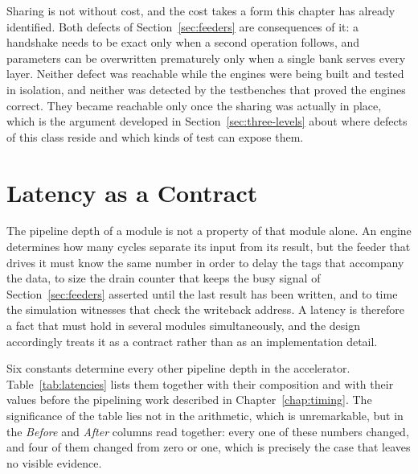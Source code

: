 Sharing is not without cost, and the cost takes a form this chapter has already
identified. Both defects of Section~\ref{sec:feeders} are consequences of it: a
handshake needs to be exact only when a second operation follows, and
parameters can be overwritten prematurely only when a single bank serves every
layer. Neither defect was reachable while the engines were being built and
tested in isolation, and neither was detected by the testbenches that proved
the engines correct. They became reachable only once the sharing was actually
in place, which is the argument developed in Section~\ref{sec:three-levels}
about where defects of this class reside and which kinds of test can expose
them.

\section{Latency as a Contract}
\label{sec:latency-contract}

The pipeline depth of a module is not a property of that module alone. An engine
determines how many cycles separate its input from its result, but the feeder
that drives it must know the same number in order to delay the tags that
accompany the data, to size the drain counter that keeps the busy signal of
Section~\ref{sec:feeders} asserted until the last result has been written, and
to time the simulation witnesses that check the writeback address. A latency is
therefore a fact that must hold in several modules simultaneously, and the
design accordingly treats it as a contract rather than as an implementation
detail.

Six constants determine every other pipeline depth in the accelerator.
Table~\ref{tab:latencies} lists them together with their composition and with
their values before the pipelining work described in Chapter~\ref{chap:timing}.
The significance of the table lies not in the arithmetic, which is
unremarkable, but in the \emph{Before} and \emph{After} columns read together:
every one of these numbers changed, and four of them changed from zero or one,
which is precisely the case that leaves no visible evidence.

